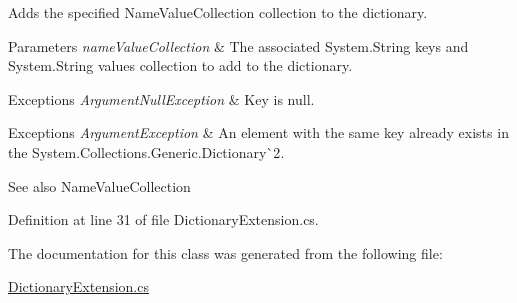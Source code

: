 Adds the specified {\ttfamily Name\+Value\+Collection} collection to the dictionary. 


\begin{DoxyParams}{Parameters}
{\em name\+Value\+Collection} & The associated {\ttfamily System.\+String} keys and {\ttfamily System.\+String} values collection to add to the dictionary. \\
\hline
\end{DoxyParams}



\begin{DoxyExceptions}{Exceptions}
{\em Argument\+Null\+Exception} & Key is null. \\
\hline
\end{DoxyExceptions}



\begin{DoxyExceptions}{Exceptions}
{\em Argument\+Exception} & An element with the same key already exists in the {\ttfamily System.\+Collections.\+Generic.\+Dictionary\`{}2}. \\
\hline
\end{DoxyExceptions}


\begin{DoxySeeAlso}{See also}
Name\+Value\+Collection


\end{DoxySeeAlso}


Definition at line 31 of file Dictionary\+Extension.\+cs.



The documentation for this class was generated from the following file\+:\begin{DoxyCompactItemize}
\item 
\mbox{\hyperlink{DictionaryExtension_8cs}{Dictionary\+Extension.\+cs}}\end{DoxyCompactItemize}

